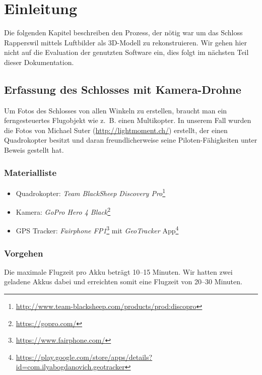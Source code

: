 \chapter{Einleitung}


Die folgenden Kapitel beschreiben den Prozess, der nötig war um das Schloss
Rapperswil mittels Luftbilder als 3D-Modell zu rekonstruieren. Wir gehen hier
nicht auf die Evaluation der genutzten Software ein, dies folgt im nächsten Teil
dieser Dokumentation.


\section{Erfassung des Schlosses mit Kamera-Drohne}

Um Fotos des Schlosses von allen Winkeln zu erstellen, braucht man ein
ferngesteuertes Flugobjekt wie z.~B. einen Multikopter. In unserem Fall wurden
die Fotos von Michael Suter (\url{http://lightmoment.ch/}) erstellt, der einen
Quadrokopter besitzt und daran freundlicherweise seine Piloten-Fähigkeiten unter
Beweis gestellt hat.

\subsection{Materialliste}

\begin{itemize}
	\item Quadrokopter: \textit{Team BlackSheep Discovery
		Pro}\footnote{\url{http://www.team-blacksheep.com/products/prod:discopro}}
	\item Kamera: \textit{GoPro Hero 4 Black}\footnote{\url{https://gopro.com/}}
	\item GPS Tracker: \textit{Fairphone
		FP1}\footnote{\url{https://www.fairphone.com/}} mit
		\textit{GeoTracker}
		App\footnote{\url{https://play.google.com/store/apps/details?id=com.ilyabogdanovich.geotracker}}
\end{itemize}

\subsection{Vorgehen}

Die maximale Flugzeit pro Akku beträgt 10--15 Minuten. Wir hatten zwei geladene
Akkus dabei und erreichten somit eine Flugzeit von 20--30 Minuten.

